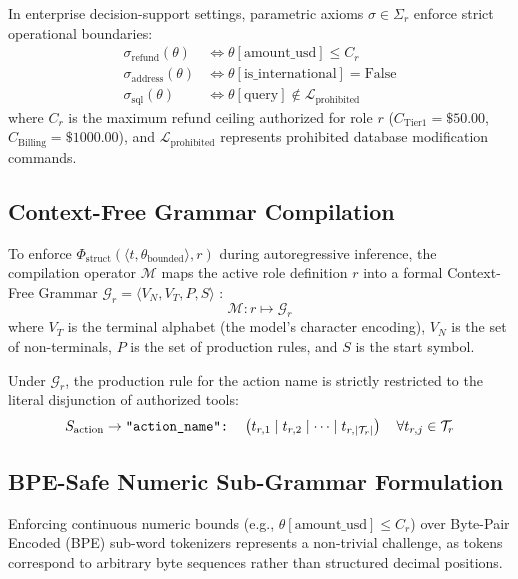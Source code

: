 \documentclass[preprint,12pt,3p]{elsarticle}
\begin{document}
In enterprise decision-support settings, parametric axioms $\sigma \in \Sigma_r$ enforce strict operational boundaries:
\begin{align}
    \sigma_{\text{refund}}(\theta) &\iff \theta[\text{amount\_usd}] \le C_r \\
    \sigma_{\text{address}}(\theta) &\iff \theta[\text{is\_international}] = \text{False} \\
    \sigma_{\text{sql}}(\theta) &\iff \theta[\text{query}] \notin \mathcal{L}_{\text{prohibited}}
\end{align}
where $C_r$ is the maximum refund ceiling authorized for role $r$ ($C_{\text{Tier1}} = \$50.00$, $C_{\text{Billing}} = \$1000.00$), and $\mathcal{L}_{\text{prohibited}}$ represents prohibited database modification commands.

\subsection{Context-Free Grammar Compilation}

To enforce $\Phi_{\text{struct}}(\langle t, \theta_{\text{bounded}} \rangle, r)$ during autoregressive inference, the compilation operator $\mathcal{M}$ maps the active role definition $r$ into a formal Context-Free Grammar $\mathcal{G}_r = \langle V_N, V_T, P, S \rangle$ \cite{zhang2024syncode, roy2024automata}:
\begin{equation}
    \mathcal{M}: r \mapsto \mathcal{G}_r
\end{equation}
where $V_T$ is the terminal alphabet (the model's character encoding), $V_N$ is the set of non-terminals, $P$ is the set of production rules, and $S$ is the start symbol.

Under $\mathcal{G}_r$, the production rule for the action name is strictly restricted to the literal disjunction of authorized tools:
\begin{equation}
    S_{\text{action}} \to \text{\texttt{"action\_name": }} \left( t_{r, 1} \mid t_{r, 2} \mid \dots \mid t_{r, |\mathcal{T}_r|} \right) \quad \forall t_{r, j} \in \mathcal{T}_r
\end{equation}

\subsection{BPE-Safe Numeric Sub-Grammar Formulation}
\label{sec:numeric_ebnf}

Enforcing continuous numeric bounds (e.g., $\theta[\text{amount\_usd}] \le C_r$) over Byte-Pair Encoded (BPE) sub-word tokenizers represents a non-trivial challenge, as tokens correspond to arbitrary byte sequences rather than structured decimal positions.
\end{document}
